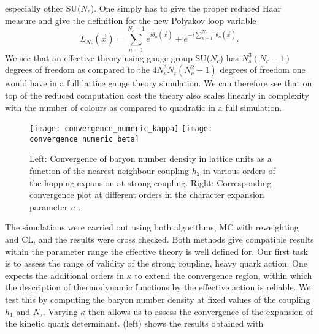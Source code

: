 especially other SU($N_c$). One simply has to give the proper reduced Haar
measure and give the definition for the new Polyakov loop variable
%
\begin{equation}
  L_{N_c}(\vec{x}) = \sum_{n=1}^{N_c-1} e^{i \theta_n(\vec{x})} + e^{-i
    \sum_{n=1}^{N_c-1} \theta_n (\vec{x})}.
\end{equation}
%
We see that an effective theory using gauge group SU($N_c$) has $N_s^3(N_c-1)$
degrees of freedom as compared to the $4 N_s^3 N_t (N_c^2 - 1)$ degrees of
freedom one would have in a full lattice gauge theory simulation. We can
therefore see that on top of the reduced computation cost the theory also scales
linearly in complexity with the number of colours as compared to quadratic in a
full simulation.

\begin{figure}
  {\centering
    \texttt{[image: convergence\_numeric\_kappa]}
    \texttt{[image: convergence\_numeric\_beta]}
    \par}
  \caption[
    Left: Convergence of baryon number density in lattice units as a
      function of the nearest neighbour coupling $h_2$ in various orders of the
      hopping expansion at strong coupling. Right: Corresponding convergence plot
      at different orders in the character expansion parameter $u$.
  ]{
    Left: Convergence of baryon number density in lattice units as a
    function of the nearest neighbour coupling $h_2$ in various orders of the
    hopping expansion at strong coupling. Right: Corresponding convergence plot
    at different orders in the character expansion parameter $u$
    \protect\footnotemark.}
  \label{fig:numerical_convergence}
\end{figure}
%
%
The simulations were carried out using both algorithms, MC with reweighting and
CL, and the results were cross checked. Both methods give compatible results
within the parameter range the effective theory is well defined for. Our first
task is to assess the range of validity of the strong coupling, heavy quark
action. One expects the additional orders in $\kappa$ to extend the convergence
region, within which the description of thermodynamic functions by the effective
action is reliable. We test this by computing the baryon number density at fixed
values of the coupling $h_1$ and $N_{\tau}$.  Varying $\kappa$ then allows us to
assess the convergence of the expansion of the kinetic quark determinant.
 (left) shows the results obtained with
